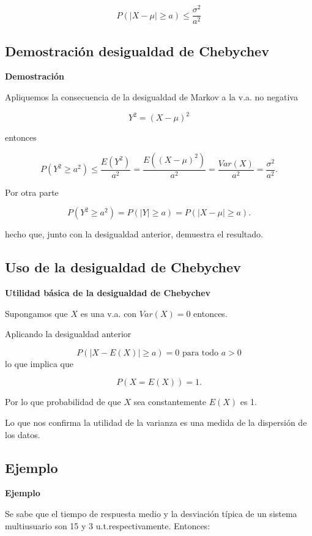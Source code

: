 \documentclass[]{book}
\begin{document}
\[P(|X-\mu|\geq a)\leq \frac{\sigma^2}{a^2}\]

\hypertarget{demostraciuxf3n-desigualdad-de-chebychev}{%
\subsection{Demostración desigualdad de Chebychev}\label{demostraciuxf3n-desigualdad-de-chebychev}}

\textbf{Demostración}

Apliquemos la consecuencia de la desigualdad de Markov a la v.a.
no negativa

\[Y^2=(X-\mu)^2\]

entonces

\[
P(Y^2\geq a^2) \leq 
\frac{E(Y^2)}{a^2}=\frac{E((X-\mu)^2)}{a^2}
= \frac{Var(X)}{a^2}=\frac{\sigma^2}{a^2}
.
\]

Por otra parte

\[
P(Y^2\geq a^2)=P(|Y|\geq a)= P(|X-\mu|\geq a).
\]

hecho que, junto con la desigualdad anterior,
demuestra el resultado.

\hypertarget{uso-de-la-desigualdad-de-chebychev}{%
\subsection{Uso de la desigualdad de Chebychev}\label{uso-de-la-desigualdad-de-chebychev}}

 \textbf{Utilidad básica de la desigualdad de Chebychev}

Supongamos que \(X\) es una v.a. con \(Var(X)=0\)
entonces.

Aplicando la desigualdad anterior

\[P(|X-E(X)|\geq a )=0\mbox{ para todo }a>0\]
lo que implica que

\[P(X=E(X))=1.\]

Por lo que probabilidad de que \(X\) sea
constantemente \(E(X)\) es 1.

Lo que nos confirma la utilidad de la varianza es una
medida de la dispersión de los datos.

\hypertarget{ejemplo-23}{%
\subsection{Ejemplo}\label{ejemplo-23}}

\textbf{Ejemplo}

Se sabe que el tiempo de respuesta medio y la desviación típica de un sistema multiusuario son 15 y 3 u.t.respectivamente. Entonces:
\end{document}
